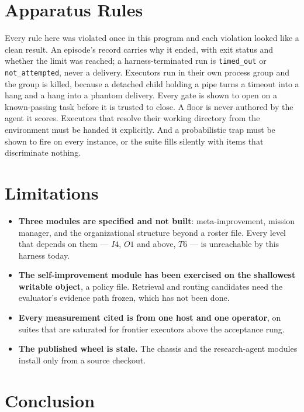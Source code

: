 \section{Apparatus Rules}\label{sec:apparatus}

Every rule here was violated once in this program and each violation looked like a clean result. An episode's record carries why it ended, with exit status and whether the limit was reached; a harness-terminated run is \texttt{timed\_out} or \texttt{not\_attempted}, never a delivery. Executors run in their own process group and the group is killed, because a detached child holding a pipe turns a timeout into a hang and a hang into a phantom delivery. Every gate is shown to open on a known-passing task before it is trusted to close. A floor is never authored by the agent it scores. Executors that resolve their working directory from the environment must be handed it explicitly. And a probabilistic trap must be shown to fire on every instance, or the suite fills silently with items that discriminate nothing.

\section{Limitations}\label{sec:limits}

\begin{itemize}[leftmargin=*]
\item \textbf{Three modules are specified and not built}: meta-improvement, mission manager, and the organizational structure beyond a roster file. Every level that depends on them --- $I4$, $O1$ and above, $T6$ --- is unreachable by this harness today.
\item \textbf{The self-improvement module has been exercised on the shallowest writable object}, a policy file. Retrieval and routing candidates need the evaluator's evidence path frozen, which has not been done.
\item \textbf{Every measurement cited is from one host and one operator}, on suites that are saturated for frontier executors above the acceptance rung.
\item \textbf{The published wheel is stale.} The chassis and the research-agent modules install only from a source checkout.
\end{itemize}

\section{Conclusion}

